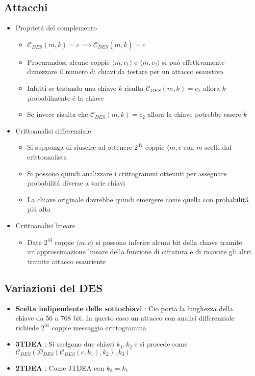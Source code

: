 \subsection{Attacchi}
\begin{itemize}
    \item Propriet\'a del complemento
    \begin{itemize}
        \item $\mathcal{C}_{DES}(m, k) = c \implies \mathcal{C}_{DES}(\overline{m}, \overline{k}) = \overline{c}$
        \item Procurandosi alcune coppie $\langle m, c_1 \rangle$ e $\langle \overline{m}, c_2 \rangle$ si pu\`o effettivamente dimezzare il numero di chiavi da testare per un attacco esaustivo
        \item Infatti se testando una chiave $k$ risulta $\mathcal{C}_{DES}(m, k) = c_1$ allora $k$ probabilmente \'e la chiave
        \item Se invece risulta che  $\mathcal{C}_{DES}(m, k) = \overline{c_2}$ allora la chiave potrebbe essere $\overline{k}$
    \end{itemize}
    \item Crittoanalisi differenziale
    \begin{itemize}
        \item Si supponga di riuscire ad ottenere $2^{47}$ coppie $\langle m, c$ con $m$ scelti dal crittoanalista
        \item Si possono quindi analizzare i crittogrammi ottenuti per assegnare probabilit\'a diverse a varie chiavi
        \item La chiave originale dovrebbe quindi emergere come quella con probabilit\'a pi\'u alta
    \end{itemize}
    \newpage
    \item Crittoanalisi lineare
    \begin{itemize}
        \item Date $2^{43}$ coppie $\langle m, c \rangle$ si possono inferire alcuni bit della chiave tramite un'approssimazione lineare della funzione di cifratura e di ricavare gli altri tramite attacco esauriente
    \end{itemize}
\end{itemize}

\subsection{Variazioni del DES}

\begin{itemize}
    \item \textbf{Scelta indipendente delle sottochiavi} : Cio porta la lunghezza della chiave da 56 a 768 bit. In questo caso un attacco con analisi differenziale richiede $2^61$ coppie messaggio crittogramma
\item \textbf{3TDEA} : Si scelgono due chiavi $k_1, k_2$ e si procede come \\$\mathcal{C}_{DES}(\mathcal{D}_{DES}(\mathcal{C}_{DES}(c, k_1), k_2), k_3)$
\item \textbf{2TDEA} : Come 3TDEA con $k_3 = k_1$
\end{itemize}

